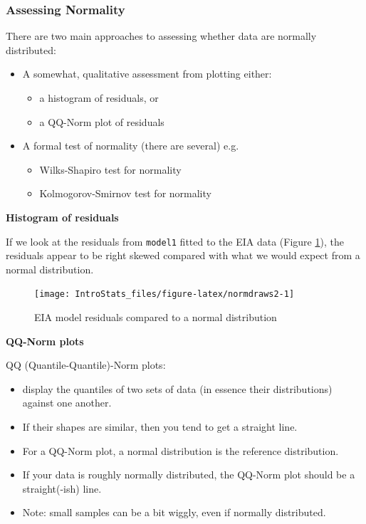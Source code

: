 \documentclass[
  oneside]{krantz}
\providecommand{\tightlist}{%
  \setlength{\itemsep}{0pt}\setlength{\parskip}{0pt}}
\begin{document}
\hypertarget{assessing-normality}{%
\subsubsection{Assessing Normality}\label{assessing-normality}}

There are two main approaches to assessing whether data are normally distributed:

\begin{itemize}
\item
  A somewhat, qualitative assessment from plotting either:

  \begin{itemize}
  \tightlist
  \item
    a histogram of residuals, or
  \item
    a QQ-Norm plot of residuals
  \end{itemize}
\item
  A formal test of normality (there are several) e.g.

  \begin{itemize}
  \tightlist
  \item
    Wilks-Shapiro test for normality
  \item
    Kolmogorov-Smirnov test for normality
  \end{itemize}
\end{itemize}

\textbf{Histogram of residuals}

If we look at the residuals from \texttt{model1} fitted to the EIA data (Figure \ref{fig:normdraws2}), the residuals appear to be right skewed compared with what we would expect from a normal distribution.

\begin{figure}

{\centering \texttt{[image: IntroStats\_files/figure-latex/normdraws2-1]} 

}

\caption{EIA model residuals compared to a normal distribution}\label{fig:normdraws2}
\end{figure}

\textbf{QQ-Norm plots}

QQ (Quantile-Quantile)-Norm plots:

\begin{itemize}
\tightlist
\item
  display the quantiles of two sets of data (in essence their distributions) against one another.
\item
  If their shapes are similar, then you tend to get a straight line.
\item
  For a QQ-Norm plot, a normal distribution is the reference distribution.
\item
  If your data is roughly normally distributed, the QQ-Norm plot should be a straight(-ish) line.
\item
  Note: small samples can be a bit wiggly, even if normally distributed.
\end{itemize}
\end{document}
